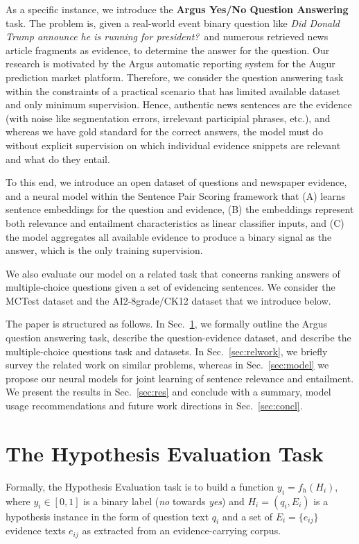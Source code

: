 \documentclass[11pt]{article}
\begin{document}
As a specific instance, we introduce the
\textbf{Argus Yes/No Question Answering} task.
The problem is, given a real-world event binary question like
\textit{Did Donald Trump announce he is running for president?}\ 
and numerous retrieved news article fragments as evidence,
to determine the answer for the question.
%
Our research is motivated by the Argus automatic reporting system for
the Augur prediction market platform. \cite{argus}
Therefore, we consider the question answering task
within the constraints of a practical scenario that has limited available dataset
and only minimum supervision.  Hence, authentic news
sentences are the evidence (with noise like segmentation errors, irrelevant participial phrases, etc.),
and whereas we have gold standard for
the correct answers, the model must do without explicit supervision on
which individual evidence snippets are relevant and what do they entail.

To this end, we introduce an open dataset of questions and newspaper evidence,
and a neural model within the Sentence Pair Scoring framework \cite{sps}
that (A) learns sentence embeddings for the question and evidence,
(B) the embeddings represent both relevance and entailment characteristics
as linear classifier inputs, and (C) the model aggregates all available evidence
to produce a binary signal as the answer, which is the only training supervision.

We also evaluate our model on
a related task that concerns ranking answers of multiple-choice questions given
a set of evidencing sentences.
We consider the MCTest dataset and the AI2-8grade/CK12 dataset that we introduce
below.

The paper is structured as follows.  In Sec.~\ref{sec:argus}, we formally outline
the Argus question answering task, describe the question-evidence dataset,
and describe the multiple-choice questions task and datasets.
In Sec.~\ref{sec:relwork}, we briefly survey the related work on similar problems,
whereas in Sec.~\ref{sec:model} we propose our neural models for joint
learning of sentence relevance and entailment.  We present the results in Sec.~\ref{sec:res}
and conclude with a summary, model usage recommendations and future work directions in Sec.~\ref{sec:concl}.

\section{The Hypothesis Evaluation Task}
\label{sec:argus}

Formally, the Hypothesis Evaluation task is to build a function $y_i = f_h(H_i)$,
where $y_i \in [0,1]$ is a binary label (\textit{no} towards \textit{yes})
and $H_i = (q_i, E_i)$ is a hypothesis instance in the form of question text $q_i$
and a set of $E_i = \{e_{ij}\}$ evidence texts $e_{ij}$ as extracted
from an evidence-carrying corpus.
\end{document}
